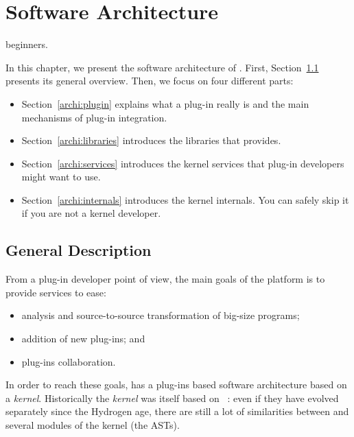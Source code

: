 
\chapter{Software Architecture}\label{chap:archi}

\begin{target}beginners.\end{target}

In this chapter, we present the software architecture of \framac. First,
Section~\ref{archi:general} presents its general overview. Then, we focus on
four different parts:

\begin{itemize}
\item Section~\ref{archi:plugin} explains what a plug-in really is and the main
  mechanisms of plug-in integration.
\item Section~\ref{archi:libraries} introduces the libraries that \framac
  provides.
\item Section~\ref{archi:services} introduces the kernel services that plug-in
  developers might want to use.
\item Section~\ref{archi:internals} introduces the kernel internals. You can
  safely skip it if you are not a \framac kernel developer.
\end{itemize}


\section{General Description}\label{archi:general}

From a plug-in developer point of view, the main goals of the \framac platform
is to provide services to ease:
\begin{itemize}
\item analysis and source-to-source transformation of big-size \C programs;
\item addition of new plug-ins; and
\item plug-ins collaboration.
\end{itemize}

In order to reach these goals, \framac has a plug-ins based software
architecture based on a \emph{kernel}. Historically the
\emph{kernel} was itself based on \cil~\cite{cil}: even if they have evolved
separately since the \framac Hydrogen age, there are still a lot of similarities
between \cil and several modules of the \framac kernel (\eg the ASTs).

